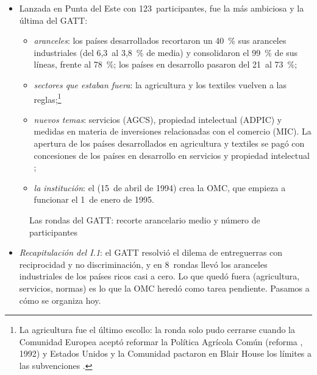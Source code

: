 \documentclass[11pt]{article}
\begin{document}
\begin{itemize}
\item Lanzada en Punta del Este con 123~participantes, fue la más ambiciosa y la última del GATT\nocite{OMC2026AniosGATT}:
  \begin{itemize}
  \item \emph{aranceles}: los países desarrollados recortaron un 40~\% sus aranceles industriales (del 6,3~al 3,8~\% de media) y consolidaron el 99~\% de sus líneas, frente al 78~\%; los países en desarrollo pasaron del 21~al 73~\%\nocite{OMC2026Aranceles};
  \item \emph{sectores que estaban fuera}: la agricultura y los textiles vuelven a las reglas;\footnote{La agricultura fue el último escollo: la ronda solo pudo cerrarse cuando la Comunidad Europea aceptó reformar la Política Agrícola Común (reforma , 1992) y Estados Unidos y la Comunidad pactaron en Blair House los límites a las subvenciones .}
  \item \emph{nuevos temas}: servicios (AGCS), propiedad intelectual (ADPIC) y medidas en materia de inversiones relacionadas con el comercio (MIC). La apertura de los países desarrollados en agricultura y textiles se pagó con concesiones de los países en desarrollo en servicios y propiedad intelectual ;
  \item \emph{la institución}: el  (15~de abril de 1994) crea la OMC, que empieza a funcionar el 1~de enero de 1995.
  \end{itemize}
\end{itemize}

\begin{figure}[H]
\centering
\caption{Las rondas del GATT: recorte arancelario medio y número de participantes}\label{fig:rondas}
\end{figure}

\begin{itemize}
\item \emph{Recapitulación del I.1}: el GATT resolvió el dilema de entreguerras con reciprocidad y no discriminación, y en 8~rondas llevó los aranceles industriales de los países ricos casi a cero. Lo que quedó fuera (agricultura, servicios, normas) es lo que la OMC heredó como tarea pendiente. Pasamos a cómo se organiza hoy.
\end{itemize}
\end{document}
